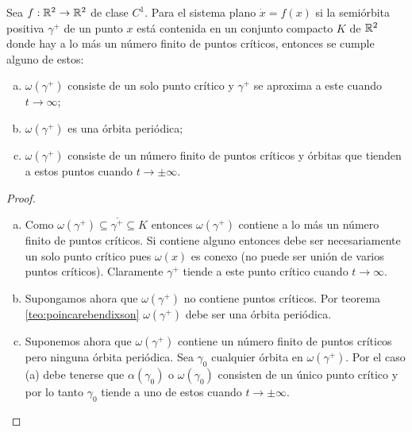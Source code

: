 \begin{corollary} \label{teo:poincarebendixson2} Sea $f: {\mathbb{R}}^2 \to {\ensuremath{\mathbb{R}}}^2$ de clase $C^1$. Para el sistema plano $\dot{x} = f(x)$ si la semiórbita positiva $\gamma^+$ de un punto $x$ está contenida en un conjunto compacto $K$ de ${\mathbb{R}}^2$ donde hay a lo más un número finito de puntos críticos, entonces se cumple alguno de estos:

	\begin{enumerate}[(a)]
		\item $\omega(\gamma^+)$ consiste de un solo punto crítico  y $\gamma^+$ se aproxima a este cuando $t \to \infty$;
		\item $\omega(\gamma^+)$ es una órbita periódica;
		\item $\omega(\gamma^+)$ consiste de un número finito de puntos críticos y órbitas que tienden a estos puntos cuando $t \to \pm \infty$.
	\end{enumerate}
\end{corollary}

\begin{proof}
\begin{enumerate}[(a)]
	\item Como $\omega(\gamma^+) \subseteq \overline{\gamma^+} \subseteq K$ entonces $\omega(\gamma^+)$ contiene a lo más un número finito de puntos críticos. Si contiene alguno entonces debe ser necesariamente un solo punto crítico pues $\omega(x)$ es conexo (no puede ser unión de varios puntos críticos). Claramente $\gamma^+$ tiende a este punto crítico cuando $t \to \infty$.
	\item Supongamos ahora que $\omega(\gamma^+)$ no contiene puntos críticos. Por teorema \ref{teo:poincarebendixson} $\omega(\gamma^+)$ debe ser una órbita periódica.
	\item Suponemos ahora que $\omega(\gamma^+)$ contiene un número finito de puntos críticos pero ninguna órbita periódica. Sea $\gamma_0$ cualquier órbita en $\omega(\gamma^+)$. Por el caso (a) debe tenerse que $\alpha(\gamma_0)$ o $\omega(\gamma_0)$ consisten de un único punto crítico y por lo tanto $\gamma_0$ tiende a uno de estos cuando $t \to \pm \infty$.
\end{enumerate}
\end{proof}

